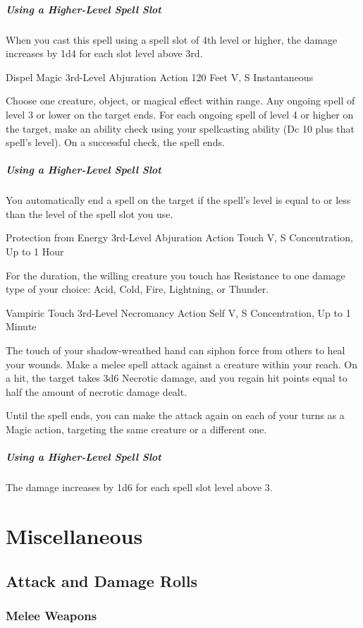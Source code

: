 \documentclass[letterpaper,openany,oneside,twocolumn]{book}
\begin{document}
\subparagraph*{Using a Higher-Level Spell Slot} When you cast this spell using a spell slot of 4th level or higher, the damage increases by 1d4 for each slot level above 3rd.

\DndSpellHeader
  {Dispel Magic}
  {3rd-Level Abjuration}
  {Action}
  {120 Feet}
  {V, S}
  {Instantaneous}

Choose one creature, object, or magical effect within range. Any ongoing spell of level 3 or lower on the target ends. For each ongoing spell of level 4 or higher on the target, make an ability check using your spellcasting ability (Dc 10 plus that spell's level). On a successful check, the spell ends.

\subparagraph*{Using a Higher-Level Spell Slot} You automatically end a spell on the target if the spell's level is equal to or less than the level of the spell slot you use.

\DndSpellHeader
  {Protection from Energy}
  {3rd-Level Abjuration}
  {Action}
  {Touch}
  {V, S}
  {Concentration, Up to 1 Hour}

For the duration, the willing creature you touch has Resistance to one damage type of your choice: Acid, Cold, Fire, Lightning, or Thunder.

\DndSpellHeader
  {Vampiric Touch}
  {3rd-Level Necromancy}
  {Action}
  {Self}
  {V, S}
  {Concentration, Up to 1 Minute}

The touch of your shadow-wreathed hand can siphon force from others to heal your wounds. Make a melee spell attack against a creature within your reach. On a hit, the target takes 3d6 Necrotic damage, and you regain hit points equal to half the amount of necrotic damage dealt.

Until the spell ends, you can make the attack again on each of your turns as a Magic action, targeting the same creature or a different one.

\subparagraph*{Using a Higher-Level Spell Slot} The damage increases by 1d6 for each spell slot level above 3.

\section*{Miscellaneous}
\subsection*{Attack and Damage Rolls}
\subsubsection*{Melee Weapons}
\end{document}
